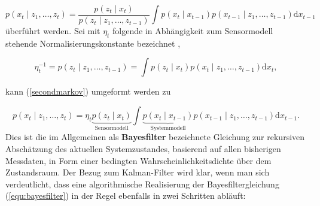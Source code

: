 \documentclass[12pt,a4paper,headsepline,bibliography=totoc,listof=totoc,headinclude=false,footinclude=false,BCOR5mm]{scrreprt} %
\begin{document}
\begin{equation}\label{secondmarkov}
p\left(x_{t}\mid z_{1}, \ldots, z_{t}\right)=\frac{p\left(z_{t}\mid x_{t}\right)}{p\left(z_{t}\mid z_{1}, \ldots, z_{t-1}\right) }\int p\left(x_{t}\mid x_{t-1}\right)p\left(x_{t-1}\mid z_{1}, \ldots, z_{t-1}\right)\mathrm{d} x_{t-1}
\end{equation} {\"u}berf{\"u}hrt werden. Sei mit $\eta_{t}$ folgende in Abh{\"a}ngigkeit zum Sensormodell stehende Normalisierungskonstante bezeichnet \cite[S. 175]{Arulampalam2002ATO},

\begin{equation}
\eta_{t}^{-1}=p\left(z_{t}\mid z_{1}, \ldots, z_{t-1}\right)=\int p\left(z_{t}\mid x_{t}\right)p\left(x_{t}\mid z_{1}, \ldots, z_{t-1}\right)\mathrm{d}x_{t},
\end{equation} 

kann (\ref{secondmarkov}) umgeformt werden zu

\begin{equation}\label{equ:bayesfilter}
p\left(x_{t}\mid z_{1}, \ldots, z_{t}\right)=\eta_{t} \underbrace{p\left(z_{t}\mid x_{t}\right)}_{\text{Sensormodell}}\int \underbrace{p\left(x_{t}\mid  x_{t-1}\right)}_{\text{Systemmodell}}p\left(x_{t-1}\mid z_{1}, \ldots, z_{t-1}\right)\mathrm{d} x_{t-1}.
\end{equation} Dies ist die im Allgemeinen als \textbf{Bayesfilter} bezeichnete Gleichung zur rekursiven Absch{\"a}tzung des aktuellen Systemzustandes, basierend auf allen bisherigen Messdaten, in Form einer bedingten Wahrscheinlichkeitsdichte {\"u}ber dem Zustandsraum. Der Bezug zum Kalman-Filter wird klar, wenn man sich verdeutlicht, dass eine algorithmische Realisierung der Bayesfiltergleichung (\ref{equ:bayesfilter})  in der Regel ebenfalls in zwei Schritten abl{\"a}uft:
\end{document}
